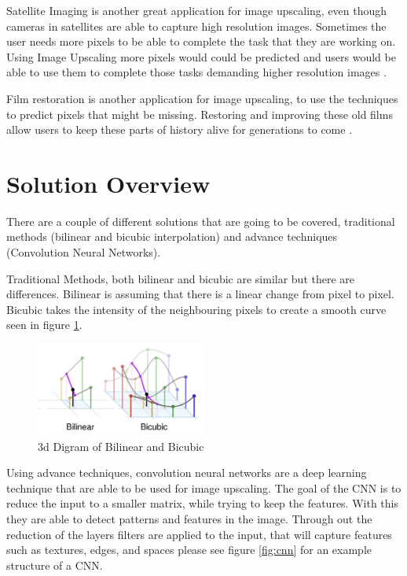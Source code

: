\documentclass{article}
\begin{document}
Satellite Imaging is another great application for image upscaling, even though cameras in satellites are able to capture high resolution images. Sometimes the user needs more pixels to be able to complete the task that they are working on. Using Image Upscaling more pixels would could be predicted and users would be able to use them to complete those tasks demanding higher resolution images \cite{Buczkowski2023}.

Film restoration is another application for image upscaling, to use the techniques to predict pixels that might be missing. Restoring and improving these old films allow users to keep these parts of history alive for generations to come \cite{MACHIDON2018181}.

\section{Solution Overview}

There are a couple of different solutions that are going to be covered, traditional methods (bilinear and bicubic interpolation) and advance techniques (Convolution Neural Networks).

Traditional Methods, both bilinear and bicubic are similar but there are differences. Bilinear is assuming that there is a linear change from pixel to pixel. Bicubic takes the intensity of the neighbouring pixels to create a smooth curve seen in figure \ref{fig:bilin_bicub}.

\begin{figure}[h]
    \centering
    \includegraphics[width=0.5\textwidth]{bilinear_bicubic}
    \caption{3d Digram of Bilinear and Bicubic \cite{rao2023image}}
    \label{fig:bilin_bicub}
\end{figure}

Using advance techniques, convolution neural networks are a deep learning technique that are able to be used for image upscaling. The goal of the CNN is to reduce the input to a smaller matrix, while trying to keep the features. With this they are able to detect patterns and features in the image. Through out the reduction of the layers filters are applied to the input, that will capture features such as textures, edges, and spaces please see figure \ref{fig:cnn} for an example structure of a CNN.
\end{document}
